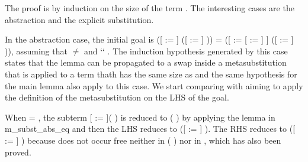 \begin{coqdoccode}
es.e2:400}{\coqdocvariable{e2}}\coqref{lambda es.:::'[' x ':=' x ']' x}{\coqdocnotation{)]([}}\coqref{lambda es.y:403}{\coqdocvariable{y}} \coqref{lambda es.:::'[' x ':=' x ']' x}{\coqdocnotation{:=}} \coqref{lambda es.e3:402}{\coqdocvariable{e3}}\coqref{lambda es.:::'[' x ':=' x ']' x}{\coqdocnotation{]}}\coqref{lambda es.e1:399}{\coqdocvariable{e1}}\coqref{lambda es.:::'[' x ':=' x ']' x}{\coqdocnotation{)}}\coqref{lambda es.:::x '=a' x}{\coqdocnotation{)}}.\coqdoceol
\end{coqdoccode}
 The proof is by induction on the size of the term . The interesting cases are the abstraction and the explicit substitution.
\begin{coqdoccode}
\end{coqdoccode}
In the abstraction case, the initial goal is ([ := ] ([ := ]   )) = ([ := [ := ] ] ([ := ]   )), assuming that  \ensuremath{\not=}  and  ``  . The induction hypothesis generated by this case states that the lemma can be propagated to a swap inside a metasubstitution that is applied to a term thath has the same size as  and the same hypothesis for the main lemma also apply to this case. We start comparing  with  aiming to apply the definition of the metasubstitution on the LHS of the goal.
\begin{coqdoccode}
\end{coqdoccode}
When  = , the subterm [ := ](  ) is reduced to (  ) by applying the lemma in m\_subst\_abs\_eq and then the LHS reduces to ([ := ]   ). The RHS reduces to ([ := ]   ) because  does not occur free neither in (  ) nor in , which has also been proved.
\begin{coqdoccode}
\end{coqdoccode}
